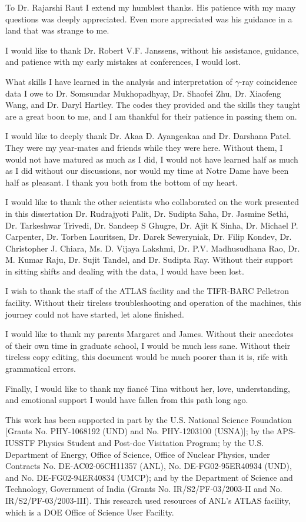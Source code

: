 \documentclass[final,numrefs,sort&compress]{nddiss2e}
\begin{document}
\begin{acknowledge}
To Dr. Rajarshi Raut I extend my humblest thanks. His patience with my many questions was deeply appreciated. Even more appreciated was his guidance in a land that was strange to me.

I would like to thank Dr. Robert V.F. Janssens, without his assistance, guidance, and patience with my early mistakes at conferences, I would lost.

What skills I have learned in the analysis and interpretation of $\gamma{}$-ray coincidence data I owe to Dr. Somsundar Mukhopadhyay, Dr. Shaofei Zhu, Dr. Xiaofeng Wang, and Dr. Daryl Hartley. The codes they provided and the skills they taught are a great boon to me, and I am thankful for their patience in passing them on.

I would like to deeply thank Dr. Akaa D. Ayangeakaa and Dr. Darshana Patel. They were my year-mates and friends while they were here. Without them, I would not have matured as much as I did, I would not have learned half as much as I did without our discussions, nor would my time at Notre Dame have been half as pleasant. I thank you both from the bottom of my heart.

I would like to thank the other scientists who collaborated on the work presented in this dissertation Dr. Rudrajyoti Palit, Dr. Sudipta Saha, Dr. Jasmine Sethi, Dr. Tarkeshwar Trivedi, Dr. Sandeep S Ghugre, Dr. Ajit K Sinha, Dr. Michael P. Carpenter, Dr. Torben Lauritsen, Dr. Darek Seweryniak, Dr. Filip Kondev, Dr. Christopher J. Chiara, Ms. D. Vijaya Lakshmi,  Dr. P.V. Madhusudhana Rao, Dr. M. Kumar Raju, Dr. Sujit Tandel, and Dr. Sudipta Ray. Without their support in sitting shifts and dealing with the data, I would have been lost.

I wish to thank the staff of the ATLAS facility and the TIFR-BARC Pelletron facility. Without their tireless troubleshooting and operation of the machines, this journey could not have started, let alone finished.

I would like to thank my parents Margaret and James. Without their anecdotes of their own time in graduate school, I would be much less sane. Without their tireless copy editing, this document would be much poorer than it is, rife with grammatical errors.

Finally, I would like to thank my fianc\'{e} Tina without her, love, understanding, and emotional support I would have fallen from this path long ago.

This work has been supported in part by the U.S. National Science Foundation [Grants No. PHY-1068192 (UND) and No. PHY-1203100 (USNA)]; by the APS-IUSSTF Physics Student and Post-doc Visitation Program; by the U.S. Department of Energy, Office of Science, Office of Nuclear  Physics,  under  Contracts  No.  DE-AC02-06CH11357 (ANL), No. DE-FG02-95ER40934 (UND), and No. DE-FG02-94ER40834 (UMCP); and by the Department of Science and Technology, Government of India (Grants No. IR/S2/PF-03/2003-II and No. IR/S2/PF-03/2003-III). This research used resources of ANL’s ATLAS facility, which is a DOE Office of Science User Facility.
\end{acknowledge}
\end{document}
